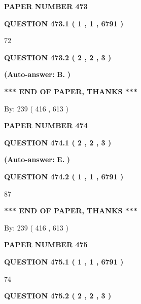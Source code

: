 \documentclass[12pt]{article}
\begin{document}
   
\newpage 
\setcounter{page}{ 
   473001 } 
   
   
 {\textbf{ \Large{ PAPER NUMBER  473  }}}
   
   
   
   
  
  
{\textbf{\large{QUESTION
473.1 
 ( 1 , 1 , 6791 )
}}}

72
  
  
{\textbf{\large{QUESTION
473.2 
 ( 2 , 2 , 3 )
}}}
 
 
{\textbf{(Auto-answer:}}
{\textbf{\large{
B.}}}
{\textbf{)}}
 
 
   
   
   
   
\vspace{1.0in} 
{\textbf{\large{ *** END OF PAPER, THANKS *** }}} 
   
   
\hspace{1.0in} By: 
 239 ( 416 ,  613 )
   
   
   
   
\newpage 
\setcounter{page}{ 
   474001 } 
   
   
 {\textbf{ \Large{ PAPER NUMBER  474  }}}
   
   
   
   
  
  
{\textbf{\large{QUESTION
474.1 
 ( 2 , 2 , 3 )
}}}
 
 
{\textbf{(Auto-answer:}}
{\textbf{\large{
E.}}}
{\textbf{)}}
 
 
  
  
{\textbf{\large{QUESTION
474.2 
 ( 1 , 1 , 6791 )
}}}

87
   
   
   
   
\vspace{1.0in} 
{\textbf{\large{ *** END OF PAPER, THANKS *** }}} 
   
   
\hspace{1.0in} By: 
 239 ( 416 ,  613 )
   
   
   
   
\newpage 
\setcounter{page}{ 
   475001 } 
   
   
 {\textbf{ \Large{ PAPER NUMBER  475  }}}
   
   
   
   
  
  
{\textbf{\large{QUESTION
475.1 
 ( 1 , 1 , 6791 )
}}}

74
  
  
{\textbf{\large{QUESTION
475.2 
 ( 2 , 2 , 3 )
}}}
 
\end{document}
